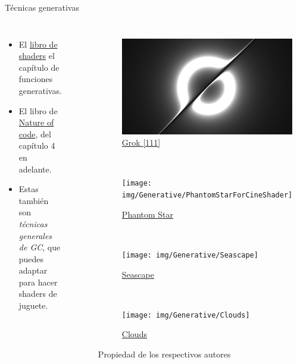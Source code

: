 \begin{frame}{Técnicas generativas}
\begin{columns}
    \begin{itemize}
         \item El \href{https://thebookofshaders.com/10/}{libro de shaders} el capítulo de funciones generativas.
         \item El libro de \href{https://natureofcode.com/}{Nature of code}, del capítulo 4 en adelante.
         \item Estas también son \emph{técnicas generales de GC}, que puedes adaptar para hacer shaders de juguete.
     \end{itemize}
\begin{figure}[htp]
 \centering
 \begin{subfigure}[b]{0.42\textwidth}
   \includegraphics[width=\textwidth]{img/Generative/Grok111}
   \caption{\href{https://www.shadertoy.com/view/wc23Wc}{Grok [111]}}
 \end{subfigure}
~
 \begin{subfigure}[b]{0.42\textwidth}
   \texttt{[image: img/Generative/PhantomStarForCineShader]}
   \caption{\href{https://www.shadertoy.com/view/ttKGDt}{Phantom Star}}
 \end{subfigure}
\\
 \begin{subfigure}[b]{0.42\textwidth}
   \texttt{[image: img/Generative/Seascape]}
   \caption{\href{https://www.shadertoy.com/view/Ms2SD1}{Seascape}}
 \end{subfigure}
~
 \begin{subfigure}[b]{0.42\textwidth}
   \texttt{[image: img/Generative/Clouds]}
   \caption{\href{https://www.shadertoy.com/view/XslGRr}{Clouds}}
 \end{subfigure}
 \caption{Propiedad de los respectivos autores}
\end{figure}
\end{columns}
\end{frame}

